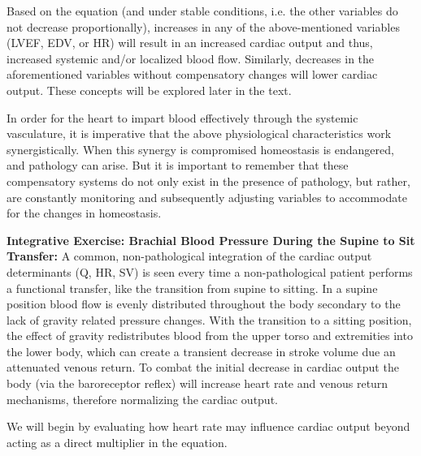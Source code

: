Based on the equation (and under stable conditions, i.e. the other variables do not decrease proportionally), increases in any of the above-mentioned variables (LVEF, EDV, or HR) will result in an increased cardiac output and thus, increased systemic and/or localized blood flow. Similarly, decreases in the aforementioned variables without compensatory changes will lower cardiac output. These concepts will be explored later in the text. 

In order for the heart to impart blood effectively through the systemic vasculature, it is imperative that the above physiological characteristics work synergistically. When this synergy is compromised homeostasis is endangered, and pathology can arise. But it is important to remember that these compensatory systems do not only exist in the presence of pathology, but rather, are constantly monitoring and subsequently adjusting variables to accommodate for the changes in homeostasis. 

\textbf{Integrative Exercise: Brachial Blood Pressure During the Supine to Sit Transfer:}
A common, non-pathological integration of the cardiac output determinants  (Q, HR, SV) is seen every time a non-pathological patient performs a functional transfer, like the transition from supine to sitting. In a supine position blood flow is evenly distributed throughout the body secondary to the lack of gravity related pressure changes. With the transition to a sitting position, the effect of gravity redistributes blood from the upper torso and extremities into the lower body, which can create a transient decrease in stroke volume due an attenuated venous return. To combat the initial decrease in cardiac output the body (via the baroreceptor reflex) will increase heart rate and venous return mechanisms, therefore normalizing the cardiac output. 

We will begin by evaluating how heart rate may influence cardiac output beyond acting as a direct multiplier in the equation. 

